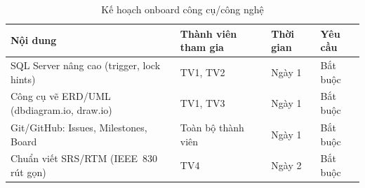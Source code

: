 \begin{table}[htbp]
    \centering
    \small
    \caption{Kế hoạch onboard công cụ/công nghệ}
    \begin{tabular}{|p{4cm}|p{3cm}|p{2.5cm}|p{2.5cm}|}
        \hline
        \textbf{Nội dung} & \textbf{Thành viên tham gia} & \textbf{Thời gian} & \textbf{Yêu cầu} \\
        \hline
        SQL Server nâng cao (trigger, lock hints) & TV1, TV2 & Ngày 1 & Bắt buộc \\
        \hline
        Công cụ vẽ ERD/UML (dbdiagram.io, draw.io) & TV1, TV3 & Ngày 1 & Bắt buộc \\
        \hline
        Git/GitHub: Issues, Milestones, Board & Toàn bộ thành viên & Ngày 1 & Bắt buộc \\
        \hline
        Chuẩn viết SRS/RTM (IEEE~830 rút gọn) & TV4 & Ngày 2 & Bắt buộc \\
        \hline
    \end{tabular}
\end{table}
